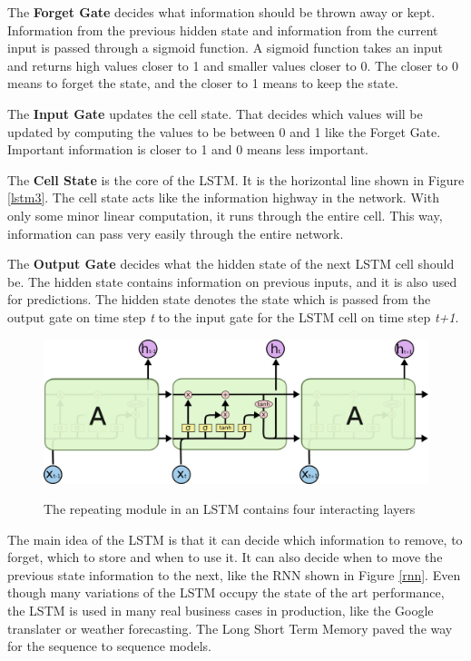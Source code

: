 The \textbf{Forget Gate} decides what information should be thrown away or kept. Information from the previous hidden state and information from the current input is passed through a sigmoid function. A sigmoid function takes an input and returns high values closer to 1 and smaller values closer to 0. The closer to 0 means to forget the state, and the closer to 1 means to keep the state.

The \textbf{Input Gate} updates the cell state. That decides which values will be updated by computing the values to be between 0 and 1 like the Forget Gate. Important information is closer to 1 and 0 means less important.

The \textbf{Cell State} is the core of the LSTM. It is the horizontal line shown in Figure \ref{lstm3}. The cell state acts like the information highway in the network. With only some minor linear computation, it runs through the entire cell. This way, information can pass very easily through the entire network. 

The \textbf{Output Gate} decides what the hidden state of the next LSTM cell should be. The hidden state contains information on previous inputs, and it is also used for predictions. The hidden state denotes the state which is passed from the output gate on time step \textit{t} to the input gate for the LSTM cell on time step \textit{t+1}.


\begin{figure}
	\begin{center}
		\includegraphics[width=4.5in]{photos/LSTM3-chain}\\
		\caption{The repeating module in an LSTM contains four interacting layers \cite{olah}}\label{lstm2}
	\end{center}
\end{figure}

The main idea of the LSTM is that it can decide which information to remove, to forget, which to store and when to use it. It can also decide when to move the previous state information to the next, like the RNN shown in Figure \ref{rnn}. Even though many variations of the LSTM occupy the state of the art performance, the LSTM is used in many real business cases in production, like the Google translater or weather forecasting.
The Long Short Term Memory paved the way for the sequence to sequence models.

